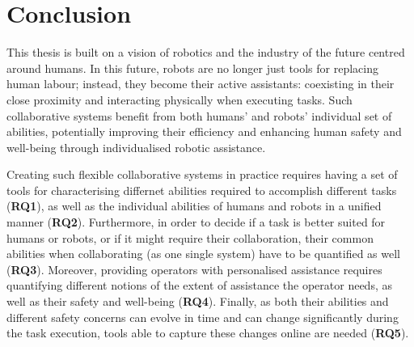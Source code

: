 \chapter{Conclusion}
\label{ch:thesis_conclusion}

This thesis is built on a vision of robotics and the industry of the future centred around humans. In this future, robots are no longer just tools for replacing human labour; instead, they become their active assistants: coexisting in their close proximity and interacting physically when executing tasks. Such collaborative systems benefit from both humans' and robots' individual set of abilities, potentially improving their efficiency and enhancing human safety and well-being through individualised robotic assistance. 




Creating such flexible collaborative systems in practice requires having a set of tools for characterising differnet abilities required to accomplish different tasks (\textbf{RQ1}), as well as the individual abilities of humans and robots in a unified manner (\textbf{RQ2}). Furthermore, in order to decide if a task is better suited for humans or robots, or if it might require their collaboration, their common abilities when collaborating (as one single system) have to be quantified as well (\textbf{RQ3}). Moreover, providing operators with personalised assistance requires quantifying different notions of the extent of assistance the operator needs, as well as their safety and well-being (\textbf{RQ4}). Finally, as both their abilities and different safety concerns can evolve in time and can change significantly during the task execution, tools able to capture these changes online are needed (\textbf{RQ5}). 


